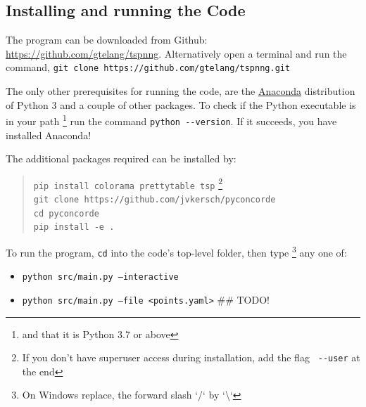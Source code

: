 \begin{appendices}

\newpage
\section{Installing and running the Code}
\label{sec:install}

The program can be downloaded from Github: \url{https://github.com/gtelang/tspnng}. Alternatively
open a terminal and run the command, \texttt{git clone https://github.com/gtelang/tspnng.git}

The only other prerequisites for running the code, are the 
\href{https://www.anaconda.com/products/individual}{Anaconda} distribution of Python 3 
and a couple of other packages.  To check if the Python executable is in your path \footnote{and that it is Python 3.7 or above}
run the command \verb|python --version|. If it succeeds, you have installed Anaconda! 

The additional packages required can be installed by: 

\begin{quote}
\color{blue}
\texttt{pip install colorama prettytable tsp} \footnote{If you don't have superuser access during installation, add the flag \texttt{\color{red} \texttt{-{}-}user} at the end}   \\
\texttt{git clone https://github.com/jvkersch/pyconcorde} \\
\texttt{cd pyconcorde}\\
\texttt{pip install -e .}
\end{quote}


To run the program, \texttt{cd} into the code's top-level folder, then type \footnote{On Windows replace, the forward slash `/` by `\textbackslash`}
any one of: 

\begin{itemize}
\item \texttt{python src/main.py --interactive}
\item \texttt{python src/main.py --file <points.yaml>} ## TODO!
\end{itemize}


\end{appendices}

